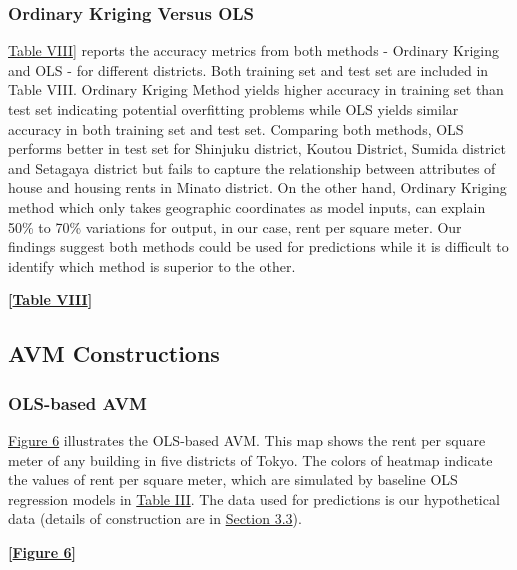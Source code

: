 \documentclass[a4paper, 12pt]{article} %
\begin{document}
\subsubsection{Ordinary Kriging Versus OLS}
\hyperref[tb8]{Table VIII}] reports the accuracy metrics from both methods - Ordinary Kriging and OLS - for different districts. Both training set and test set are included in Table VIII. Ordinary Kriging Method yields higher accuracy in training set than test set indicating potential overfitting problems while OLS yields similar accuracy in both training set and test set. Comparing both methods, OLS performs better in test set for Shinjuku district, Koutou District, Sumida district and Setagaya district but fails to capture the relationship between attributes of house and housing rents in Minato district. On the other hand, Ordinary Kriging method which only takes geographic coordinates as model inputs, can explain 50\% to 70\% variations for output, in our case, rent per square meter. Our findings suggest both methods could be used for predictions while it is difficult to identify which method is superior to the other.

\bigskip
 \centerline{\bf [\hyperref[tb8]{Table VIII}]}
\bigskip

\subsection{AVM Constructions}
\subsubsection{OLS-based AVM}
\hyperref[fig6]{Figure 6} illustrates the OLS-based AVM. This map shows the rent per square meter of any building in five districts of Tokyo. The colors of heatmap indicate the values of rent per square meter, which are simulated by baseline OLS regression models in \hyperref[tb3]{Table III}. The data used for predictions is our hypothetical data (details of construction are in \hyperref[sec33]{Section 3.3}). 

\bigskip
 \centerline{\bf [\hyperref[fig6]{Figure 6}]}
\bigskip
\end{document}
